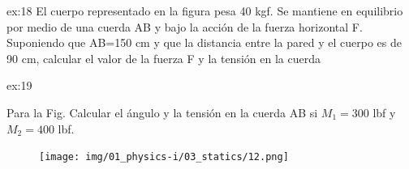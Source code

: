 \begin{multicols}{2}
     \begin{excercise}{ex:18}{
        El cuerpo representado en la figura pesa 40 kgf. Se mantiene en equilibrio por medio de una cuerda AB y bajo la acción de la fuerza horizontal F. Suponiendo que AB=150 cm y que la distancia entre la pared y el cuerpo es de 90 cm, calcular el valor de la fuerza F y la tensión en la cuerda
         } 
     \end{excercise}
     \begin{excercise}[][][$\theta=53^\circ $, $T=500\ \mathrm{lbf}$]{ex:19}{
        Para la Fig. Calcular el ángulo y la tensión en la cuerda AB si $M_1=300$ lbf y $M_2=400$ lbf.     
         \begin{figure}[H]
             \centering
             \texttt{[image: img/01\_physics-i/03\_statics/12.png]}
         \end{figure}
    } 
     \end{excercise}
    

\end{multicols}
